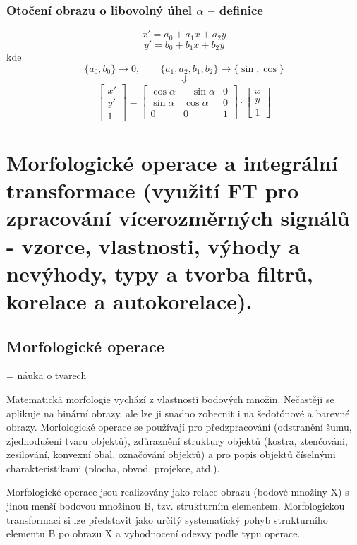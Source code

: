 \subsubsection*{Otočení obrazu o libovolný úhel $\alpha$ – definice}
\[
x' = a_0 + a_1 x + a_2 y
\]
\[
y' = b_0 + b_1 x + b_2 y
\]
kde 
\[
\{a_0, b_0\} \rightarrow 0, \qquad 
\{a_1, a_2, b_1, b_2\} \rightarrow \{\sin, \cos\}
\]
\[
\Downarrow
\]
\[
\begin{bmatrix}
x' \\
y' \\
1
\end{bmatrix}
=
\begin{bmatrix}
\cos \alpha & -\sin \alpha & 0 \\
\sin \alpha & \cos \alpha & 0 \\
0 & 0 & 1
\end{bmatrix}
\cdot
\begin{bmatrix}
x \\
y \\
1
\end{bmatrix}
\]



\section{Morfologické operace a integrální transformace (využití FT pro zpracování vícerozměrných signálů - vzorce,
vlastnosti, výhody a nevýhody, typy a tvorba filtrů, korelace a autokorelace).}

\subsection{Morfologické operace}
= náuka o tvarech

Matematická morfologie vychází z vlastností bodových množin. Nečastěji se aplikuje na binární obrazy, ale lze ji snadno zobecnit i na šedotónové a barevné obrazy. Morfologické operace se používají pro předzpracování (odstranění šumu, zjednodušení tvaru objektů), zdůraznění struktury objektů (kostra, ztenčování, zesilování, konvexní obal, označování objektů) a pro popis objektů číselnými charakteristikami (plocha, obvod, projekce, atd.).

Morfologické operace jsou realizovány jako relace obrazu (bodové množiny X) s jinou menší bodovou množinou B, tzv. strukturním elementem. Morfologickou transformaci si lze 
představit jako určitý systematický pohyb strukturního elementu B po obrazu X a vyhodnocení odezvy podle typu operace.

